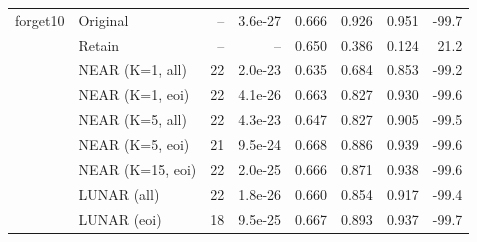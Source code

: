 \begin{table}[t]
\begin{tabular}{llrrrrrr}
forget10 & Original & -- & 3.6e-27 & 0.666 & 0.926 & 0.951 & -99.7 \\
 & Retain & -- & -- & 0.650 & 0.386 & 0.124 & 21.2 \\
 & NEAR (K=1, all) & 22 & 2.0e-23 & 0.635 & 0.684 & 0.853 & -99.2 \\
 & NEAR (K=1, eoi) & 22 & 4.1e-26 & 0.663 & 0.827 & 0.930 & -99.6 \\
 & NEAR (K=5, all) & 22 & 4.3e-23 & 0.647 & 0.827 & 0.905 & -99.5 \\
 & NEAR (K=5, eoi) & 21 & 9.5e-24 & 0.668 & 0.886 & 0.939 & -99.6 \\
 & NEAR (K=15, eoi) & 22 & 2.0e-25 & 0.666 & 0.871 & 0.938 & -99.6 \\
 & LUNAR (all) & 22 & 1.8e-26 & 0.660 & 0.854 & 0.917 & -99.4 \\
 & LUNAR (eoi) & 18 & 9.5e-25 & 0.667 & 0.893 & 0.937 & -99.7 \\
\bottomrule
\end{tabular}
\label{tab:tofu-Llama-3.2-3B-Instruct}
\end{table}
